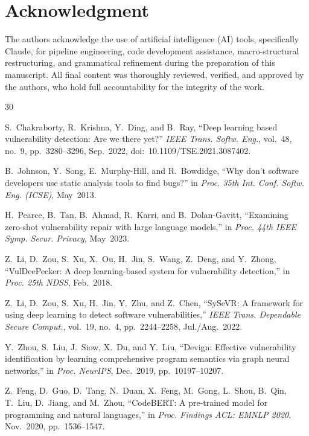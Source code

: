 \documentclass{ieeeaccess}
\begin{document}
\section*{Acknowledgment}
The authors acknowledge the use of artificial intelligence (AI) tools, specifically Claude, for pipeline engineering, code development assistance, macro-structural restructuring, and grammatical refinement during the preparation of this manuscript. All final content was thoroughly reviewed, verified, and approved by the authors, who hold full accountability for the integrity of the work.

\begin{thebibliography}{30}

 S.~Chakraborty, R.~Krishna, Y.~Ding, and B.~Ray, ``Deep learning based vulnerability detection: Are we there yet?'' \emph{IEEE Trans. Softw. Eng.}, vol.~48, no.~9, pp.~3280--3296, Sep.~2022, doi:~10.1109/TSE.2021.3087402.

 B.~Johnson, Y.~Song, E.~Murphy-Hill, and R.~Bowdidge, ``Why don't software developers use static analysis tools to find bugs?'' in \emph{Proc. 35th Int. Conf. Softw. Eng. (ICSE)}, May~2013.

 H.~Pearce, B.~Tan, B.~Ahmad, R.~Karri, and B.~Dolan-Gavitt, ``Examining zero-shot vulnerability repair with large language models,'' in \emph{Proc. 44th IEEE Symp. Secur. Privacy}, May~2023.

 Z.~Li, D.~Zou, S.~Xu, X.~Ou, H.~Jin, S.~Wang, Z.~Deng, and Y.~Zhong, ``VulDeePecker: A deep learning-based system for vulnerability detection,'' in \emph{Proc. 25th NDSS}, Feb.~2018.

 Z.~Li, D.~Zou, S.~Xu, H.~Jin, Y.~Zhu, and Z.~Chen, ``SySeVR: A framework for using deep learning to detect software vulnerabilities,'' \emph{IEEE Trans. Dependable Secure Comput.}, vol.~19, no.~4, pp.~2244--2258, Jul./Aug.~2022.

 Y.~Zhou, S.~Liu, J.~Siow, X.~Du, and Y.~Liu, ``Devign: Effective vulnerability identification by learning comprehensive program semantics via graph neural networks,'' in \emph{Proc. NeurIPS}, Dec.~2019, pp.~10197--10207.

 Z.~Feng, D.~Guo, D.~Tang, N.~Duan, X.~Feng, M.~Gong, L.~Shou, B.~Qin, T.~Liu, D.~Jiang, and M.~Zhou, ``CodeBERT: A pre-trained model for programming and natural languages,'' in \emph{Proc. Findings ACL: EMNLP 2020}, Nov.~2020, pp.~1536--1547.


\end{thebibliography}
\end{document}
